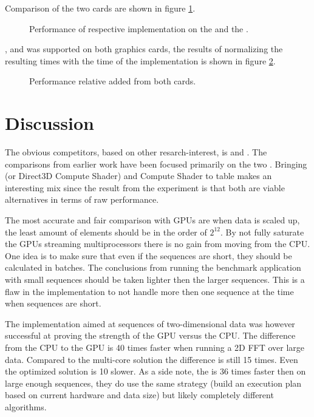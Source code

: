 Comparison of the two cards are shown in figure \ref{fig:gpu-comparison-2d}.

\begin{figure}[\AllPlacementOptions]
	\centering
	
	\caption{Performance of respective implementation on the {\AMDCARD} and the {\NVCARD}.}
	\label{fig:gpu-comparison-2d}
\end{figure}

{\DX}, {\GL} and {\OCL} was supported on both graphics cards, the results of normalizing the resulting times with the time of the {\OCL} implementation is shown in figure \ref{fig:gpu-comparison-tech-2d}.

\begin{figure}[\AllPlacementOptions]
	\centering
	
	\caption{Performance relative {\OCL} added from both cards.}
	\label{fig:gpu-comparison-tech-2d}
\end{figure}

\newpage

\section{Discussion}

The obvious competitors, based on other resarch-interest, is {\CU} and {\OCL}. The comparisons from earlier work have been focused primarily on the two \cite{Fang2011b}\cite{Karimi2010}\cite{Park2011}\cite{Su2012b}. Bringing {\DX} (or Direct3D Compute Shader) and {\GL} Compute Shader to table makes an interesting mix since the result from the experiment is that both are viable alternatives in terms of raw performance.

The most accurate and fair comparison with GPUs are when data is scaled up, the least amount of elements should be in the order of $2^{12}$. By not fully saturate the GPUs streaming multiprocessors there is no gain from moving from the CPU. One idea is to make sure that even if the sequences are short, they should be calculated in batches. The conclusions from running the benchmark application with small sequences should be taken lighter then the larger sequences. This is a flaw in the implementation to not handle more then one sequence at the time when sequences are short.

The implementation aimed at sequences of two-dimensional data was however successful at proving the strength of the GPU versus the CPU. The difference from the CPU to the GPU is 40 times faster when running a 2D FFT over large data. Compared to the multi-core {\OMP} solution the difference is still 15 times. Even the optimized {\FFTW} solution is 10 slower. As a side note, the {\CUFFT} is 36 times faster then {\FFTW} on large enough sequences, they do use the same strategy (build an execution plan based on current hardware and data size) but likely completely different algorithms.

